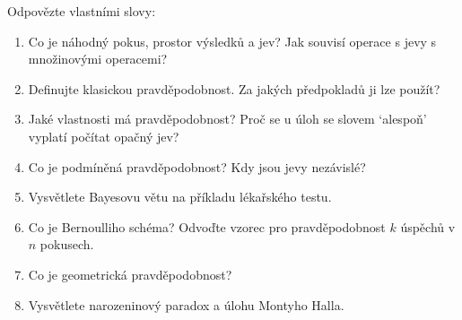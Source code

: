 \begin{problem}
  Odpovězte vlastními slovy:
  \begin{enumerate}
    \item Co je náhodný pokus, prostor výsledků a jev? Jak souvisí operace s jevy s množinovými operacemi?
    \item Definujte klasickou pravděpodobnost. Za jakých předpokladů ji lze použít?
    \item Jaké vlastnosti má pravděpodobnost? Proč se u úloh se slovem `alespoň' vyplatí počítat opačný jev?
    \item Co je podmíněná pravděpodobnost? Kdy jsou jevy nezávislé?
    \item Vysvětlete Bayesovu větu na příkladu lékařského testu.
    \item Co je Bernoulliho schéma? Odvoďte vzorec pro pravděpodobnost $k$ úspěchů v $n$ pokusech.
    \item Co je geometrická pravděpodobnost?
    \item Vysvětlete narozeninový paradox a úlohu Montyho Halla.
  \end{enumerate}
\end{problem}
